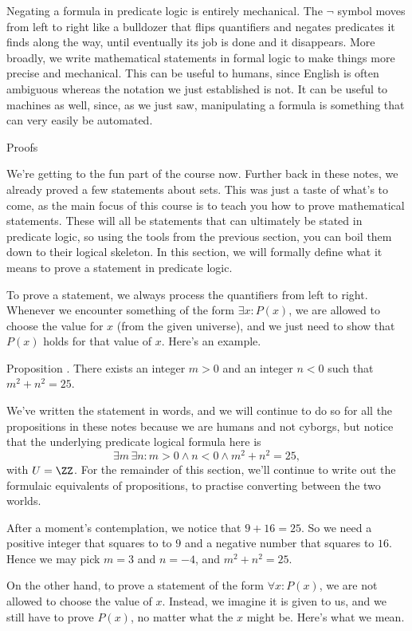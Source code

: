 Negating a formula in predicate logic is entirely mechanical.
The $\neg$ symbol moves from left to right like a bulldozer that flips quantifiers and negates
predicates it finds along the way, until eventually its job is done and it disappears.
More broadly, we write mathematical statements in formal logic to make things more precise and mechanical.
This can be useful to humans, since English is often ambiguous whereas the notation we just established
is not. It can be useful to machines as well,
since, as we just saw, manipulating a formula is something that can very easily be automated.

\advsect Proofs

We're getting to the fun part of the course now.
Further back in these notes, we already proved a few statements about sets. This was just a taste of
what's to come, as the main focus of this course is to teach you how to prove mathematical statements.
These will all be statements that can ultimately be stated in predicate logic, so using the tools
from the previous section, you can boil them down to their logical skeleton. In this section, we will
formally define what it means to prove a statement in predicate logic.

To prove a statement, we always process the quantifiers from left to right. Whenever we encounter something
of the form $\exists x: P(x)$, we are allowed to choose the value for $x$ (from the given universe), and we
just need to show that $P(x)$ holds for that value of $x$. Here's an example.

\proclaim Proposition \advthm. There exists an integer $m>0$ and an integer $n<0$ such that $m^2 + n^2 = 25$.

\noindent We've written the statement in words, and we will continue to do so for all the propositions
in these notes because we are humans and not cyborgs,
but notice that the underlying predicate logical formula here is
$$\exists m\,\exists n : m>0 \wedge n< 0 \wedge m^2 + n^2 = 25,$$
with $U = \ZZ$. For the remainder of this section, we'll continue to write out the formulaic equivalents
of propositions, to practise converting between the two worlds.

\proof After a moment's contemplation, we notice that $9 + 16 = 25$. So we need a positive integer that
squares to to $9$ and a negative number that squares to $16$. Hence we may pick $m = 3$ and $n=-4$,
and $m^2 + n^2 = 25$.\slug

On the other hand, to prove a statement of the form $\forall x : P(x)$, we are not allowed to choose the
value of $x$. Instead, we imagine it is given to us, and we still have to prove $P(x)$, no matter what
the $x$ might be. Here's what we mean.

